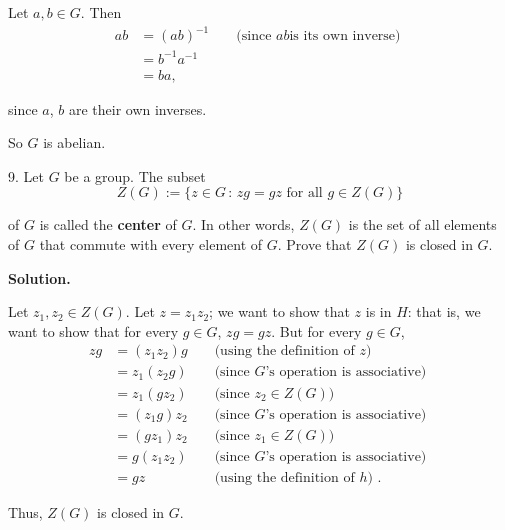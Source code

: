 \documentclass[10pt,]{book}
\newcommand{\terminology}[1]{\textbf{#1}}
\theoremstyle{plain}
\theoremstyle{definition}
\theoremstyle{definition}
\theoremstyle{definition}
\theoremstyle{definition}
\numberwithin{equation}{section}
\newcommand{\amp}{ & }
\begin{document}
\begin{exerciselist}
      Let \(a,b\in G\). Then%
%
\begin{align*}
ab\amp =(ab)^{-1}\amp \amp \text{ (since \(ab\)
        is its own inverse) }\\
\amp =b^{-1}a^{-1}\amp \amp\\
\amp =ba, \amp
\end{align*}
\par
since \(a\), \(b\) are their own inverses.%
\par

      So \(G\) is abelian.
\item[9.]\hypertarget{zgdef}{}
        Let \(G\) be a group. The subset
\begin{equation*}

          Z(G):=\{z \in G\,:\, zg=gz \mbox{ for all } g\in Z(G)\}
        
\end{equation*}

        of \(G\) is called the \terminology{center} of \(G\). In other words, \(Z(G)\) is the set of all elements of \(G\) that commute with every element of \(G\).
        Prove that \(Z(G)\) is closed in \(G\).
\par\smallskip
\par\smallskip
\noindent\textbf{Solution.}\hypertarget{solution-20}{}\quad

      Let \(z_1, z_2\in Z(G)\). Let \(z=z_1z_2\); we want to
      show that \(z\) is in \(H\): that is, we want to show that for every \(g\in G\),
      \(zg=gz\). But for every \(g\in G\),
\begin{align*}
zg\amp =(z_1z_2)g\amp \amp  \text{ (using the definition of \(z\)) }\\
\amp =z_1(z_2g)\amp \amp  \text{ (since \(G\)'s operation is associative) }\\
\amp =z_1(gz_2)\amp \amp  \text{ (since \(z_2\in Z(G)\)) }\\
\amp =(z_1g)z_2 \amp \amp  \text{ (since \(G\)'s operation is associative) }\\
\amp =(gz_1)z_2 \amp \amp  \text{ (since \(z_1\in Z(G)\)) }\\
\amp =g(z_1z_2)\amp \amp   \text{ (since \(G\)'s operation is associative) }\\
\amp =gz \amp \amp  \text{ (using the definition of \(h\)) } .
\end{align*}

\par

      Thus, \(Z(G)\) is closed in \(G\).
\end{exerciselist}
\typeout{************************************************}
\typeout{************************************************}
\end{document}

